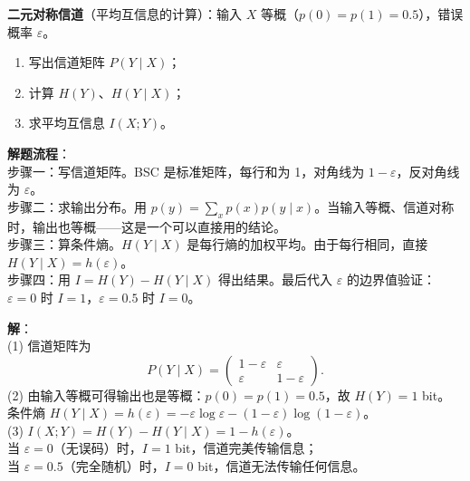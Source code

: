 \begin{example}
\label{ex:ch2-bsc-mutual-information}
\textbf{二元对称信道}（平均互信息的计算）：输入 $X$ 等概（$p(0)=p(1)=0.5$），错误概率 $\varepsilon$。
\begin{enumerate}
  \item 写出信道矩阵 $P(Y\mid X)$；
  \item 计算 $H(Y)$、$H(Y\mid X)$；
  \item 求平均互信息 $I(X;Y)$。
\end{enumerate}

\noindent \textbf{解题流程}：\\[2pt]
步骤一：写信道矩阵。BSC 是标准矩阵，每行和为 1，对角线为 $1-\varepsilon$，反对角线为 $\varepsilon$。\\
步骤二：求输出分布。用 $p(y)=\sum_x p(x)p(y\mid x)$。当输入等概、信道对称时，输出也等概——这是一个可以直接用的结论。\\
步骤三：算条件熵。$H(Y\mid X)$ 是每行熵的加权平均。由于每行相同，直接 $H(Y\mid X)=h(\varepsilon)$。\\
步骤四：用 $I=H(Y)-H(Y\mid X)$ 得出结果。最后代入 $\varepsilon$ 的边界值验证：$\varepsilon=0$ 时 $I=1$，$\varepsilon=0.5$ 时 $I=0$。

\textbf{解}：\\
(1) 信道矩阵为
\[
P(Y\mid X) = \begin{pmatrix}
1-\varepsilon & \varepsilon \\
\varepsilon    & 1-\varepsilon
\end{pmatrix}.
\]
(2) 由输入等概可得输出也是等概：$p(0)=p(1)=0.5$，故 $H(Y)=1$ bit。\\
条件熵 $H(Y\mid X) = h(\varepsilon) = -\varepsilon\log\varepsilon-(1-\varepsilon)\log(1-\varepsilon)$。\\
(3) $I(X;Y)=H(Y)-H(Y\mid X)=1-h(\varepsilon)$。\\[2pt]
当 $\varepsilon=0$（无误码）时，$I=1$ bit，信道完美传输信息；\\
当 $\varepsilon=0.5$（完全随机）时，$I=0$ bit，信道无法传输任何信息。

\begin{center}
\end{center}
\end{example}

